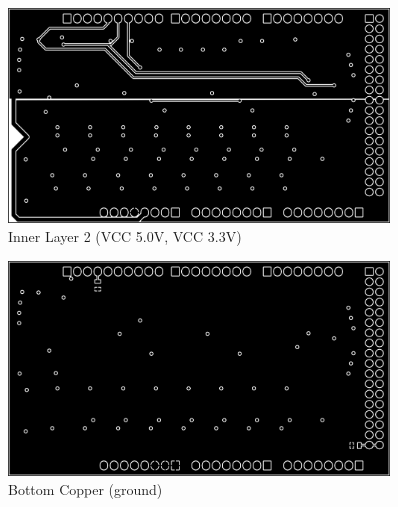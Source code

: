 \clearpage
\begin{figure}[htb]
\begin{center}
\includegraphics[width=0.9\textwidth]{graphics/image_appendix_copper_2.png}
\end{center}
\caption{Inner Layer 2 (VCC 5.0V, VCC 3.3V)} %
\label{fig:image_appendix_copper_2}
\end{figure}
%

\begin{figure}[htb]
\begin{center}
\includegraphics[width=0.9\textwidth]{graphics/image_appendix_copper_bottom.png}
\end{center}
\caption{Bottom Copper (ground)} %
\label{fig:image_appendix_copper_bottom}
\end{figure}
%



